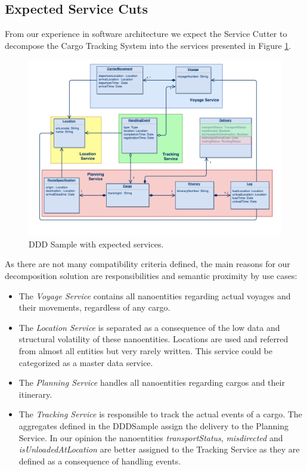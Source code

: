 \subsection{Expected Service Cuts}

From our experience in software architecture we expect the Service Cutter to decompose the Cargo Tracking System into the services presented in Figure \ref{fig:dddSampleServices}.

\begin{figure}[H]
	\includegraphics[scale=0.5]{diagrams/ddd_sample_services.pdf}
	\caption{DDD Sample with expected services.}
	\label{fig:dddSampleServices}
\end{figure}

As there are not many compatibility criteria defined, the main reasons for our decomposition solution are responsibilities and semantic proximity by use cases:

\begin{itemize}
	\item The \textit{Voyage Service} contains all nanoentities regarding actual voyages and their movements, regardless of any cargo. 
	\item The \textit{Location Service} is separated as a consequence of the low data and structural volatility of these nanoentities. Locations are used and referred from almost all entities but very rarely written. This service could be categorized as a master data service.
	\item The \textit{Planning Service} handles all nanoentities regarding cargos and their itinerary. 
	\item The \textit{Tracking Service} is responsible to track the actual events of a cargo. The aggregates defined in the DDDSample assign the delivery to the Planning Service. In our opinion the nanoentities \textit{transportStatus}, \textit{misdirected} and \textit{isUnloadedAtLocation} are better assigned to the Tracking Service as they are defined as a consequence of handling events.
\end{itemize}

